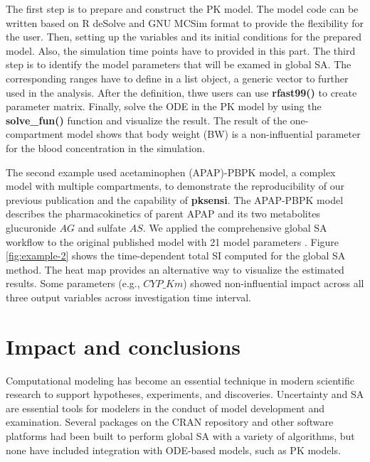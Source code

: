 \documentclass[preprint,12pt, a4paper]{elsarticle}
\begin{document}
The first step is to prepare and construct the PK model. 
The model code can be written based on R deSolve and GNU MCSim format to provide the flexibility for the user. 
Then, setting up the variables and its initial conditions for the prepared model.
Also, the simulation time points have to provided in this part.
The third step is to identify the model parameters that will be examed in global SA.
The corresponding ranges have to define in a list object, a generic vector to further used in the analysis. 
After the definition, thwe users can use \textbf{rfast99()} to create parameter matrix. 
Finally, solve the ODE in the PK model by using the \textbf{solve\_fun()} function and visualize the result. The result of the one-compartment model shows that body weight (BW) is a non-influential parameter for the blood concentration in the simulation.

The second example used acetaminophen (APAP)-PBPK model, 
a complex model with multiple compartments, to demonstrate the reproducibility of our previous publication \cite{fphar201800588} and the capability of \textbf{pksensi}. 
The APAP-PBPK model describes the pharmacokinetics of parent APAP and its two metabolites glucuronide \(AG\) and sulfate \(AS\). 
We applied the comprehensive global SA workflow to the original published model with 21 model parameters \cite{s13318-015-0253-x}. 
Figure \ref{fig:example-2} shows the time-dependent total SI computed for the global SA method. The heat map provides an alternative way to visualize the estimated results. Some parameters (e.g., \(CYP\_Km\)) showed non-influential impact across all three output variables across investigation time interval.

\section{Impact and conclusions}

Computational modeling has become an essential technique in modern 
scientific research to support hypotheses, experiments, and discoveries. 
Uncertainty and SA are essential tools for modelers in the conduct of model 
development and examination. 
Several packages on the CRAN repository and other software platforms had been
built to perform global SA with a variety of algorithms, but none have included 
integration with ODE-based models, such as PK models. 
\end{document}
